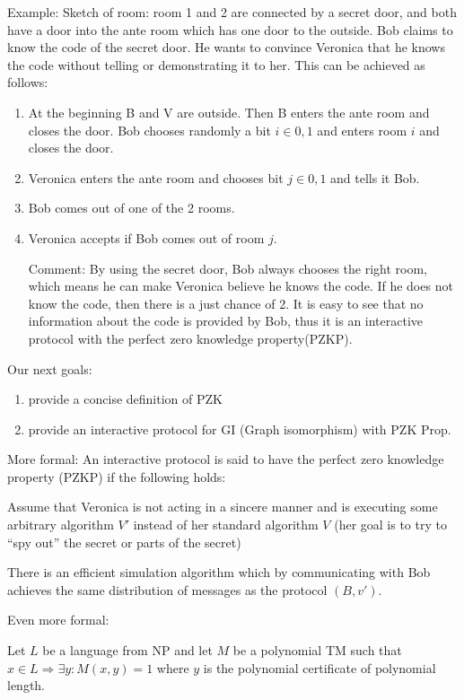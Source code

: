 \documentclass[11pt]{article}
\theoremstyle{definition}
\theoremstyle{definition}
\begin{document}
Example: Sketch of room: room 1 and 2 are connected by a secret door, and both have a door into the ante room which has one door to the outside. Bob claims to know the code of the secret door. He wants to convince Veronica that he knows the code without telling or demonstrating it to her.
This can be achieved as follows:
\begin{enumerate}
\item At the beginning B and V are outside. Then B enters the ante room and closes the door. Bob chooses randomly a bit $i \in {0,1}$ and enters room $i$ and closes the door.
\item Veronica enters the ante room and chooses bit $j \in {0,1}$ and tells it Bob.
\item Bob comes out of one of the 2 rooms.
\item Veronica accepts if Bob comes out of room $j$.

Comment: By using the secret door, Bob always chooses the right room, which means he can make Veronica believe he knows the code. If he does not know the code, then there is a just chance of 2.
It is easy to see that no information about the code is provided by Bob, thus it is an interactive protocol with the perfect zero knowledge property(PZKP).
\end{enumerate}


Our next goals:
\begin{enumerate}
\item provide a concise definition of PZK
\item provide an interactive protocol for GI (Graph isomorphism) with PZK Prop.
\end{enumerate}

More formal: An interactive protocol is said to have the perfect zero knowledge property (PZKP) if the following holds:

Assume that Veronica is not acting in a sincere manner and is executing some arbitrary algorithm $ V' $ instead of her standard algorithm $ V $ (her goal is to try to ``spy out'' the secret or parts of the secret)

There is an efficient simulation algorithm which by communicating with Bob achieves the same distribution of messages as the protocol $ (B, v') $.
\medskip

Even more formal:

Let $ L $ be a language from NP and let $ M $ be a polynomial TM such that $ x \in L \Rightarrow \exists y: M(x, y) = 1 $ where $ y $ is the polynomial certificate of polynomial length.
\end{document}

